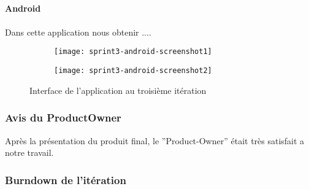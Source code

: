 \paragraph{Android}
\paragraph*{}
Dans cette application nous obtenir ....

\begin{figure}[htbp]
    \begin{subfigure}{.5\textwidth}
    \centering
  \centering
  \texttt{[image: sprint3-android-screenshot1]}
  \caption{}
  \label{fig:sprint3-android-screenshot1}
\end{subfigure}
\begin{subfigure}{.5\textwidth}
    \centering
  \centering
  \texttt{[image: sprint3-android-screenshot2]}
  \caption{}
  \label{fig:sprint3-android-screenshot2}
\end{subfigure}
\caption{Interface de l'application au troisième itération}
\end{figure}
\clearpage
\subsubsection{Avis du ProductOwner}
Après la présentation du produit final, le ”Product-Owner” était très satisfait 
a notre travail.
\subsubsection{Burndown de l’itération}
\paragraph*{}

